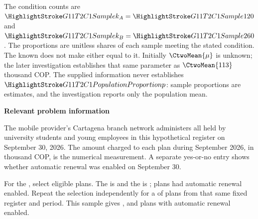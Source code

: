 The condition counts are $\Sam{k_A}=\Sam{120}$ and $\Sam{k_B}=\Sam{260}$. The proportions are unitless shares of each sample meeting the stated condition. The known  does not make either  equal to it. Initially $\CtwoMean{\mu}$ is unknown; the later investigation establishes that same parameter as $\CtwoMean{113}$ thousand COP. The supplied information never establishes $\PP{p}$: sample proportions are estimates, and the investigation reports only the population mean.

\secInicio[][sec:p2]

\clearpage



\textbf{Relevant problem information}

\begin{probleminfoexcerpt}
The mobile provider's Cartagena branch network administers all      held by university students and young employees in this hypothetical register on September 30, 2026. The amount charged to each plan during September 2026, in thousand COP, is the numerical measurement. A separate yes-or-no entry shows whether automatic renewal was enabled on September 30.
\end{probleminfoexcerpt}

\begin{probleminfoexcerpt}
For the    , select  eligible plans. The    is    and the    is   ;  plans had automatic renewal enabled. Repeat the selection independently for a     of  plans from that same fixed register and period. This sample gives     ,       and  plans with automatic renewal enabled.
\end{probleminfoexcerpt}



